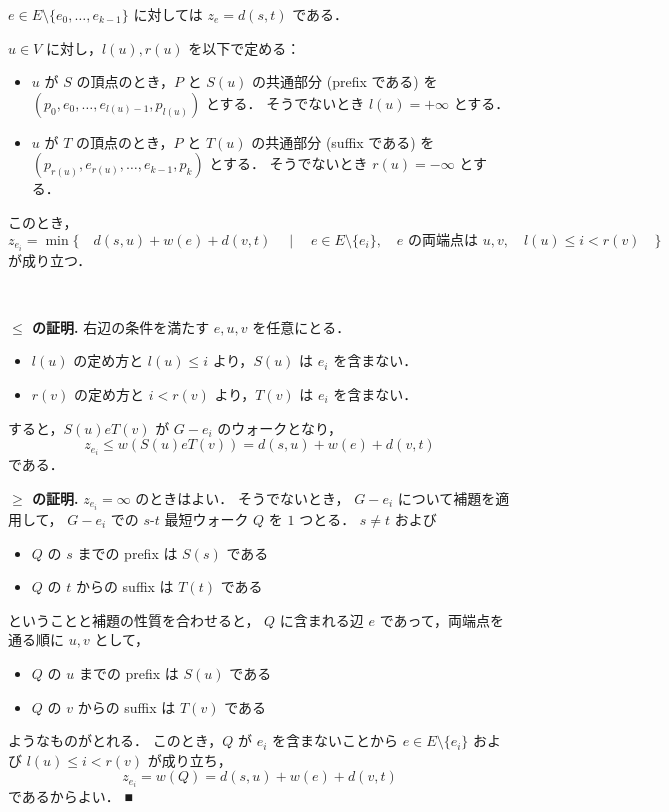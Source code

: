 \documentclass{jsarticle}
\begin{document}
$e \in E \setminus \{e_0, \ldots, e_{k-1}\}$ に対しては
$z_e = d(s, t)$ である．

$u \in V$ に対し，$l(u), r(u)$ を以下で定める：
\begin{itemize}
  \item $u$ が $S$ の頂点のとき，$P$ と $S(u)$ の共通部分 (prefix である) を
      $(p_0, e_0, \ldots, e_{l(u)-1}, p_{l(u)})$ とする．
      そうでないとき $l(u) = +\infty$ とする．
  \item $u$ が $T$ の頂点のとき，$P$ と $T(u)$ の共通部分 (suffix である) を
      $(p_{r(u)}, e_{r(u)}, \ldots, e_{k-1}, p_k)$ とする．
      そうでないとき $r(u) = -\infty$ とする．
\end{itemize}

このとき，
\[
  z_{e_i}
  = \min\{ \quad
      d(s, u) + w(e) + d(v, t)
      \quad \mid \quad
      e \in E \setminus \{e_i\},\quad \text{$e$ の両端点は $u, v$},\quad l(u) \le i < r(v)
  \quad \}
\]
が成り立つ．

\

\noindent\textbf{$\le$ の証明.}
右辺の条件を満たす $e, u, v$ を任意にとる．
\begin{itemize}
  \item $l(u)$ の定め方と $l(u) \le i$ より，$S(u)$ は $e_i$ を含まない．
  \item $r(v)$ の定め方と $i <   r(v)$ より，$T(v)$ は $e_i$ を含まない．
\end{itemize}

すると，$S(u) e T(v)$ が $G-e_i$ のウォークとなり，
\[
  z_{e_i} \le w(S(u) e T(v)) = d(s, u) + w(e) + d(v, t)
\]
である．

\noindent\textbf{$\ge$ の証明.}
$z_{e_i} = \infty$ のときはよい．
そうでないとき，
$G-e_i$ について補題を適用して，
$G-e_i$ での $s$-$t$ 最短ウォーク $Q$ を $1$ つとる．
$s \ne t$ および
\begin{itemize}
  \item $Q$ の $s$ までの prefix は $S(s)$ である
  \item $Q$ の $t$ からの suffix は $T(t)$ である
\end{itemize}
ということと補題の性質を合わせると，
$Q$ に含まれる辺 $e$ であって，両端点を通る順に $u, v$ として，
\begin{itemize}
  \item $Q$ の $u$ までの prefix は $S(u)$ である
  \item $Q$ の $v$ からの suffix は $T(v)$ である
\end{itemize}
ようなものがとれる．
このとき，$Q$ が $e_i$ を含まないことから
$e \in E \setminus \{e_i\}$ および $l(u) \le i < r(v)$ が成り立ち，
\[
  z_{e_i} = w(Q) = d(s, u) + w(e) + d(v, t)
\]
であるからよい．
\hfill ■
\end{document}
